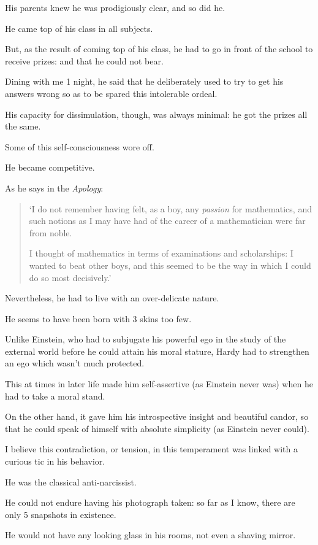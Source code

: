 \documentclass{article}
\numberwithin{equation}{section}
\begin{document}
His parents knew he was prodigiously clear, and so did he.

He came top of his class in all subjects.

But, as the result of coming top of his class, he had to go in front of the school to receive prizes: and that he could not bear.

Dining with me 1 night, he said that he deliberately used to try to get his answers wrong so as to be spared this intolerable ordeal.

His capacity for dissimulation, though, was always minimal: he got the prizes all the same.

%
Some of this self-consciousness wore off.

He became competitive.

As he says in the \textit{Apology}:
\begin{quotation}
    `I do not remember having felt, as a boy, any \textit{passion} for mathematics, and such notions as I may have had of the career of a mathematician were far from noble.
    
    I thought of mathematics in terms of examinations and scholarships: I wanted to beat other boys, and this seemed to be the way in which I could do so most decisively.'
\end{quotation}
Nevertheless, he had to live with an over-delicate nature.

He seems to have been born with 3 skins too few.

Unlike Einstein, who had to subjugate his powerful ego in the study of the external world before he could attain his moral stature, Hardy had to strengthen an ego which wasn't much protected.

This at times in later life made him self-assertive (as Einstein never was) when he had to take a moral stand.

On the other hand, it gave him his introspective insight and beautiful candor, so that he could speak of himself with absolute simplicity (as Einstein never could).

%
I believe this contradiction, or tension, in this temperament was linked with a curious tic in his behavior.

He was the classical anti-narcissist.

He could not endure having his photograph taken: so far as I know, there are only 5 snapshots in existence.

He would not have any looking glass in his rooms, not even a shaving mirror.
\end{document}
